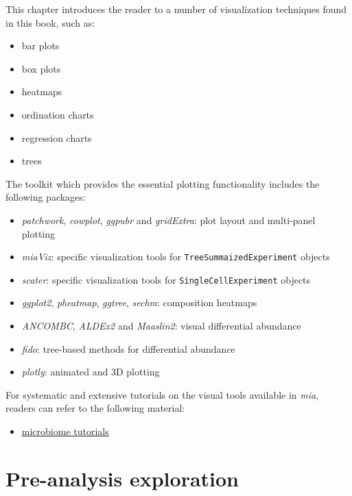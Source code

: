 \documentclass[
]{book}
\providecommand{\tightlist}{%
  \setlength{\itemsep}{0pt}\setlength{\parskip}{0pt}}
\begin{document}
This chapter introduces the reader to a number of visualization techniques found in this book, such as:

\begin{itemize}
\tightlist
\item
  bar plots
\item
  box plots
\item
  heatmaps
\item
  ordination charts
\item
  regression charts
\item
  trees
\end{itemize}

The toolkit which provides the essential plotting functionality includes the following packages:

\begin{itemize}
\tightlist
\item
  \emph{patchwork}, \emph{cowplot}, \emph{ggpubr} and \emph{gridExtra}: plot layout and multi-panel plotting
\item
  \emph{miaViz}: specific visualization tools for \texttt{TreeSummaizedExperiment} objects
\item
  \emph{scater}: specific visualization tools for \texttt{SingleCellExperiment} objects
\item
  \emph{ggplot2}, \emph{pheatmap}, \emph{ggtree}, \emph{sechm}: composition heatmaps
\item
  \emph{ANCOMBC}, \emph{ALDEx2} and \emph{Maaslin2}: visual differential abundance
\item
  \emph{fido}: tree-based methods for differential abundance
\item
  \emph{plotly}: animated and 3D plotting
\end{itemize}

For systematic and extensive tutorials on the visual tools available in \emph{mia}, readers can refer to the following material:

\begin{itemize}
\tightlist
\item
  \href{https://microbiome.github.io/tutorials/}{microbiome tutorials}
\end{itemize}

\hypertarget{pre-analysis-exploration}{%
\section{Pre-analysis exploration}\label{pre-analysis-exploration}}
\end{document}
